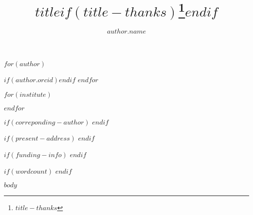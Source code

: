 \documentclass[AMA,STIX2COL,Linenumberson]{MRM}
\begin{document}
\title{$title$$if(title-thanks)$\protect\thanks{$title-thanks$}$endif$}

$for(author)$
\author[$for(author.institute)$$author.institute$$sep$,$endfor$]{$author.name$}{$if(author.orcid)$$endif$}
$endfor$


$for(institute)$
\address[$institute.index$]{$institute.name$}
$endfor$

$if(correponding-author)$
$endif$

$if(present-address)$
$endif$

$if(funding-info)$
$endif$



$if(wordcount)$
$endif$


\maketitle


$body$
\end{document}
